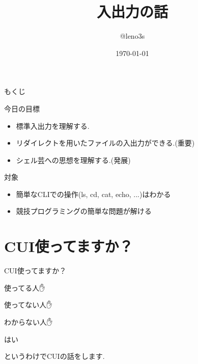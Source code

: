 \documentclass[uplatex, dvipdfmx, unicode]{beamer}
\title{入出力の話}
\author{@leno3s}
\date{\today}
\institute{leno3s.net}
\begin{document}
\maketitle

\begin{frame}{もくじ}
  \tableofcontents
\end{frame}

\begin{frame}{今日の目標}
  \begin{itemize}
    \item{標準入出力を理解する.}
    \item{リダイレクトを用いたファイルの入出力ができる.(重要)}
    \item{シェル芸への思想を理解する.(発展)}
  \end{itemize}
  

\end{frame}

\begin{frame}{対象}
  \begin{itemize}
    \item{簡単なCLIでの操作(ls, cd, cat, echo, ...)はわかる}
    \item{競技プログラミングの簡単な問題が解ける}
  \end{itemize}

\end{frame}

\section{CUI使ってますか？}
\begin{frame}
  \centering
  \Huge{CUI使ってますか？}
\end{frame}

\begin{frame}
  \centering
  \Huge{使ってる人✋}
\end{frame}

\begin{frame}
  \centering
  \Huge{使ってない人✋}
\end{frame}

\begin{frame}
  \centering
  \Huge{わからない人✋}
\end{frame}

\begin{frame}
  \centering
  \Huge{はい}
\end{frame}

\begin{frame}
  というわけでCUIの話をします.
\end{frame}
\end{document}
